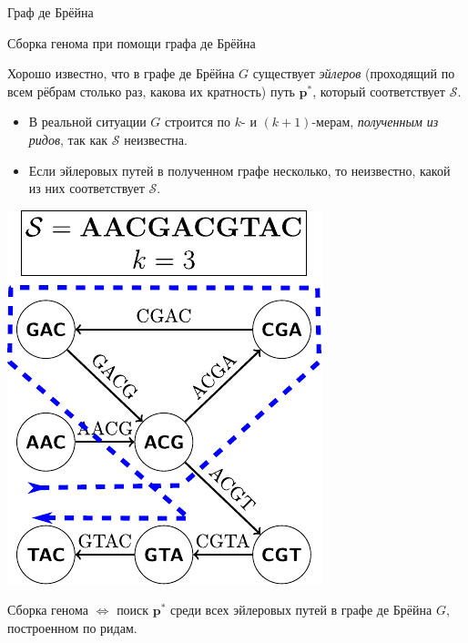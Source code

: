 \documentclass[unicode, notheorems]{beamer}
\begin{document}
\begin{frame}[fragile]{Граф де Брёйна}
\begin{minipage}{0.4\textwidth}
\begin{figure}
        \end{figure}
    \end{minipage}
\end{frame}

\begin{frame}{Сборка генома при помощи графа де Брёйна}
	\begin{minipage}{0.6\textwidth}
		Хорошо известно, что в графе де Брёйна $G$ существует \textit{эйлеров} (проходящий по всем рёбрам столько раз, какова их кратность) путь $\mathbf{p}^*$, который соответствует $\mathcal{S}$.
	
		\smallskip
		\begin{itemize}
			\item В реальной ситуации $G$ строится по $k$- и $(k+1)$-мерам, \alert{\it полученным из ридов}, так как $\mathcal{S}$ неизвестна.
			\item Если эйлеровых путей в полученном графе несколько, то неизвестно, какой из них соответствует $\mathcal{S}$.
		\end{itemize}
	\end{minipage}%
	\begin{minipage}{0.4\textwidth}
		\flushright
		\includegraphics[scale=0.7]{fig/dBg}
	\end{minipage}
	
	\vfill
	{\color{blue} Сборка генома $\iff$ поиск $\mathbf{p}^*$ среди всех эйлеровых путей в графе де Брёйна $G$, построенном по ридам.}
\end{frame}
\end{document}
